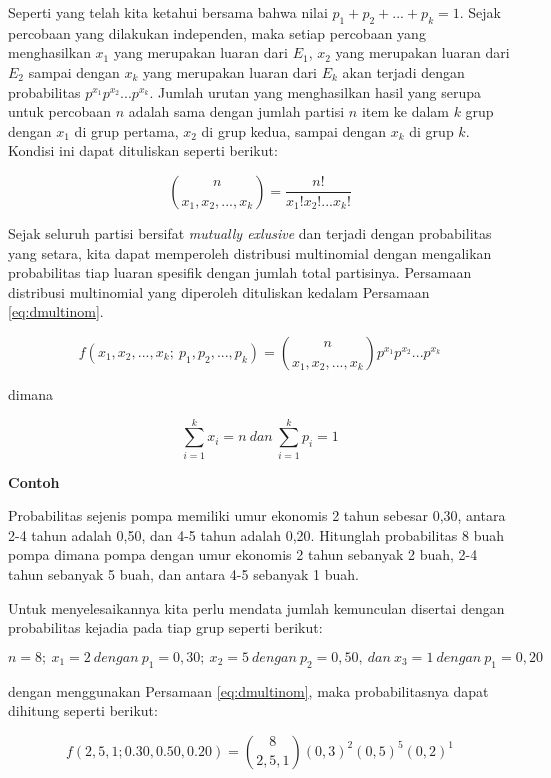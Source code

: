 \documentclass[]{book}
\begin{document}
Seperti yang telah kita ketahui bersama bahwa nilai
\(p_1+p_2+...+p_k=1\). Sejak percobaan yang dilakukan independen, maka
setiap percobaan yang menghasilkan \(x_1\) yang merupakan luaran dari
\(E_1\), \(x_2\) yang merupakan luaran dari \(E_2\) sampai dengan
\(x_k\) yang merupakan luaran dari \(E_k\) akan terjadi dengan
probabilitas \(p^{x_1}p^{x_2}...p^{x_k}\). Jumlah urutan yang
menghasilkan hasil yang serupa untuk percobaan \(n\) adalah sama dengan
jumlah partisi \(n\) item ke dalam \(k\) grup dengan \(x_1\) di grup
pertama, \(x_2\) di grup kedua, sampai dengan \(x_k\) di grup \(k\).
Kondisi ini dapat dituliskan seperti berikut:

\[
\binom{n}{x_1,x_2,...,x_k}=\frac{n!}{x_1!x_2!...x_k!}
\]

Sejak seluruh partisi bersifat \emph{mutually exlusive} dan terjadi
dengan probabilitas yang setara, kita dapat memperoleh distribusi
multinomial dengan mengalikan probabilitas tiap luaran spesifik dengan
jumlah total partisinya. Persamaan distribusi multinomial yang diperoleh
dituliskan kedalam Persamaan \eqref{eq:dmultinom}.

\begin{equation}
   f\left(x_1,x_2,...,x_k;\ p_1,p_2,...,p_k\right)=\binom{n}{x_1,x_2,...,x_k}p^{x_1}p^{x_2}...p^{x_k}
  \label{eq:dmultinom}
\end{equation}

dimana

\begin{equation}
   \sum_{i=1}^kx_i=n\ dan\ \sum_{i=1}^kp_i=1
  \label{eq:dmultinom2}
\end{equation}

\textbf{Contoh}

Probabilitas sejenis pompa memiliki umur ekonomis 2 tahun sebesar 0,30,
antara 2-4 tahun adalah 0,50, dan 4-5 tahun adalah 0,20. Hitunglah
probabilitas 8 buah pompa dimana pompa dengan umur ekonomis 2 tahun
sebanyak 2 buah, 2-4 tahun sebanyak 5 buah, dan antara 4-5 sebanyak 1
buah.

Untuk menyelesaikannya kita perlu mendata jumlah kemunculan disertai
dengan probabilitas kejadia pada tiap grup seperti berikut:

\[
n=8;\ x_1=2\ dengan\ p_1=0,30;\ x_2=5\ dengan\ p_2=0,50,\ dan\ x_3=1\ dengan\ p_1=0,20\ 
\]

dengan menggunakan Persamaan \eqref{eq:dmultinom}, maka probabilitasnya
dapat dihitung seperti berikut:

\[
f\left(2,5,1;0.30,0.50,0.20\right)=\binom{8}{2,5,1}\left(0,3\right)^2\left(0,5\right)^5\left(0,2\right)^1
\]
\end{document}
